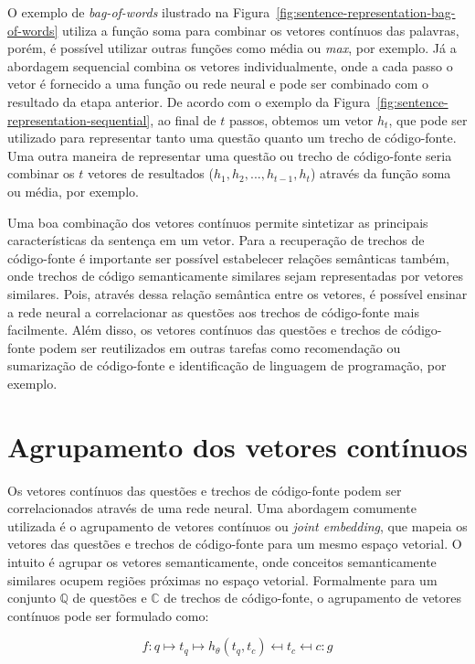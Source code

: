 O exemplo de \textit{bag-of-words} ilustrado na Figura~\ref{fig:sentence-representation-bag-of-words} utiliza a função soma para combinar os vetores contínuos das palavras, porém, é possível utilizar outras funções como média ou \emph{max}, por exemplo. Já a abordagem sequencial combina os vetores individualmente, onde a cada passo o vetor é fornecido a uma função ou rede neural e pode ser combinado com o resultado da etapa anterior. De acordo com o exemplo da Figura~\ref{fig:sentence-representation-sequential}, ao final de $t$ passos, obtemos um vetor $h_{t}$, que pode ser utilizado para representar tanto uma questão quanto um trecho de código-fonte. Uma outra maneira de representar uma questão ou trecho de código-fonte seria combinar os $t$ vetores de resultados ($h_{1}, h_{2}, ..., h_{t-1}, h_{t}$) através da função soma ou média, por exemplo. 

Uma boa combinação dos vetores contínuos permite sintetizar as principais características da sentença em um vetor. Para a recuperação de trechos de código-fonte é importante ser possível estabelecer relações semânticas também, onde trechos de código semanticamente similares sejam representadas por vetores similares. Pois, através dessa relação semântica entre os vetores, é possível ensinar a rede neural a correlacionar as questões aos trechos de código-fonte mais facilmente. Além disso, os vetores contínuos das questões e trechos de código-fonte podem ser reutilizados em outras tarefas como recomendação ou sumarização de código-fonte e identificação de linguagem de programação, por exemplo.

\section{Agrupamento dos vetores contínuos}

Os vetores contínuos das questões e trechos de código-fonte podem ser correlacionados através de uma rede neural. Uma abordagem comumente utilizada é o agrupamento de vetores contínuos ou \textit{joint embedding}, que mapeia os vetores das questões e trechos de código-fonte para um mesmo espaço vetorial. O intuito é agrupar os vetores semanticamente, onde conceitos semanticamente similares ocupem regiões próximas no espaço vetorial. Formalmente para um conjunto $\mathbb{Q}$ de questões e $\mathbb{C}$ de trechos de código-fonte, o agrupamento de vetores contínuos pode ser formulado como:

\begin{equation}
        f: q \mapsto t_{q} \mapsto h_{\theta}(t_{q}, t_{c}) \mapsfrom t_{c} \mapsfrom c :g
\end{equation}

